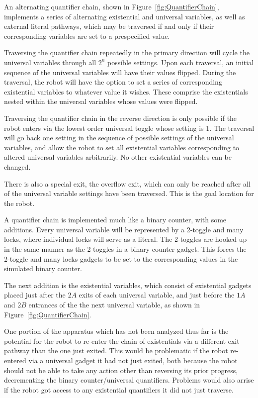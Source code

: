 An alternating quantifier chain, shown in Figure~\ref{fig:QuantifierChain}, implements a series of
alternating existential and universal variables, as well as external literal pathways, which may be traversed
if and only if their corresponding variables are set to a prespecified value.

Traversing the quantifier chain
repeatedly in the primary direction will cycle the universal variables through all $2^n$ possible settings.
Upon each traversal, an initial sequence of the universal variables will have their values flipped.
During the traversal, the robot will have the option to set a series of corresponding existential variables to whatever value it wishes. These comprise the existentials nested within the universal variables whose values were flipped.

Traversing  the quantifier chain in the reverse direction is only possible if the robot enters
via the lowest order universal toggle whose setting is $1$. The traversal will go back one setting in the
sequence of possible settings of the universal variables, and allow the robot to set all existential variables
corresponding to altered universal variables arbitrarily. No other existential variables can be changed.

There is also a special exit, the overflow exit, which can only be
reached after all of the universal variable settings have been traversed. This is the goal location for the robot.

A quantifier chain is implemented much like a binary counter, with some additions. Every universal variable will be represented by a 2-toggle and many locks, where individual locks will serve as a literal. The 2-toggles are hooked up in the same manner as the 2-toggles in a binary counter gadget. This forces the 2-toggle and many locks gadgets to be set to the corresponding values in the simulated binary counter.

The next addition is the existential variables, which consist of existential gadgets placed just after the $2A$
exits of each universal variable,
and just before the $1A$ and $2B$ entrances of the the next universal variable, as shown
in Figure~\ref{fig:QuantifierChain}.

One portion of the apparatus which has not been analyzed thus far is the potential for the robot to re-enter the chain of existentials
via a different exit pathway than the one just exited. This would be problematic if the robot re-entered via a universal gadget it had not just exited,
both because the robot should not be able to take any action other than reversing its prior progress, 
decrementing the binary counter/universal quantifiers. Problems would also arrise if the robot got access to any existential quantifiers 
it did not just traverse.

